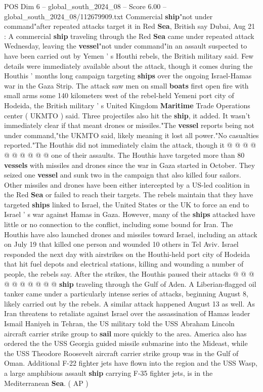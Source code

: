 \begin{textsample}{POS Dim 6 – global\_south\_2024\_08 – Score 6.00 – global\_south\_2024\_08/112679909.txt}  \label{ex:f6_pos_386}
Commercial \textbf{ship}"not under command"after repeated attacks target it in Red \textbf{Sea}, British say Dubai, Aug 21 : A commercial \textbf{ship} traveling through the Red \textbf{Sea} came under repeated attack Wednesday, leaving the \textbf{vessel}"not under command"in an assault suspected to have been carried out by Yemen ' s Houthi rebels, the British military said.
Few details were immediately available about the attack, though it comes during the Houthis ' months long campaign targeting \textbf{ships} over the ongoing Israel-Hamas war in the Gaza Strip.
The attack saw men on small \textbf{boats} first open fire with small arms some 140 kilometers west of the rebel-held Yemeni port city of Hodeida, the British military ' s United Kingdom \textbf{Maritime} Trade Operations center ( UKMTO ) said.
Three projectiles also hit the \textbf{ship}, it added.
It wasn't immediately clear if that meant drones or missiles."The \textbf{vessel} reports being not under command,"the UKMTO said, likely meaning it lost all power."No casualties reported."The Houthis did not immediately claim the attack, though it @ @ @ @ @ @ @ @ @ @ one of their assaults.
The Houthis have targeted more than 80 \textbf{vessels} with missiles and drones since the war in Gaza started in October.
They seized one \textbf{vessel} and sunk two in the campaign that also killed four sailors.
Other missiles and drones have been either intercepted by a US-led coalition in the Red \textbf{Sea} or failed to reach their targets.
The rebels maintain that they have targeted \textbf{ships} linked to Israel, the United States or the UK to force an end to Israel ' s war against Hamas in Gaza.
However, many of the \textbf{ships} attacked have little or no connection to the conflict, including some bound for Iran.
The Houthis have also launched drones and missiles toward Israel, including an attack on July 19 that killed one person and wounded 10 others in Tel Aviv.
Israel responded the next day with airstrikes on the Houthi-held port city of Hodeida that hit fuel depots and electrical stations, killing and wounding a number of people, the rebels say.
After the strikes, the Houthis paused their attacks @ @ @ @ @ @ @ @ @ @ \textbf{ship} traveling through the Gulf of Aden.
A Liberian-flagged oil tanker came under a particularly intense series of attacks, beginning August 8, likely carried out by the rebels.
A similar attack happened August 13 as well.
As Iran threatens to retaliate against Israel over the assassination of Hamas leader Ismail Haniyeh in Tehran, the US military told the USS Abraham Lincoln aircraft carrier strike group to \textbf{sail} more quickly to the area.
America also has ordered the the USS Georgia guided missile submarine into the Mideast, while the USS Theodore Roosevelt aircraft carrier strike group was in the Gulf of Oman.
Additional F-22 fighter jets have flown into the region and the USS Wasp, a large amphibious assault \textbf{ship} carrying F-35 fighter jets, is in the Mediterranean \textbf{Sea}. ( AP )

\end{textsample}

